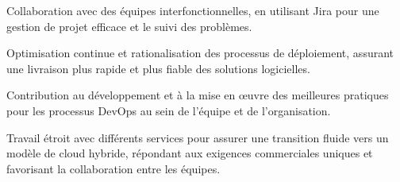 \begin{cventries}
{\begin{cvitems}
    \item {Collaboration avec des équipes interfonctionnelles, en utilisant Jira pour une gestion de projet efficace et le suivi des problèmes.}
    \item {Optimisation continue et rationalisation des processus de déploiement, assurant une livraison plus rapide et plus fiable des solutions logicielles.}
    \item {Contribution au développement et à la mise en œuvre des meilleures pratiques pour les processus DevOps au sein de l'équipe et de l'organisation.}
    \item {Travail étroit avec différents services pour assurer une transition fluide vers un modèle de cloud hybride, répondant aux exigences commerciales uniques et favorisant la collaboration entre les équipes.}
  \end{cvitems}        
}


\end{cventries}
